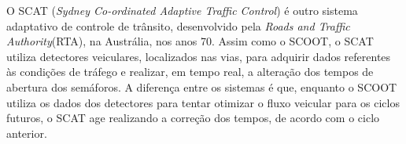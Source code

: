 
O SCAT (\textit{Sydney Co-ordinated Adaptive Traffic Control}) é outro sistema adaptativo de controle de trânsito, desenvolvido pela \textit{Roads and Traffic Authority}(RTA), na Austrália, nos anos 70. Assim como o SCOOT, o SCAT utiliza detectores veiculares, localizados nas vias, para adquirir dados referentes às condições de tráfego e realizar, em tempo real, a alteração dos tempos de abertura dos semáforos.
A diferença entre os sistemas é que, enquanto o SCOOT utiliza os dados dos detectores para tentar otimizar o fluxo veicular para os ciclos futuros, o SCAT age realizando a correção dos tempos, de acordo com o ciclo anterior.


